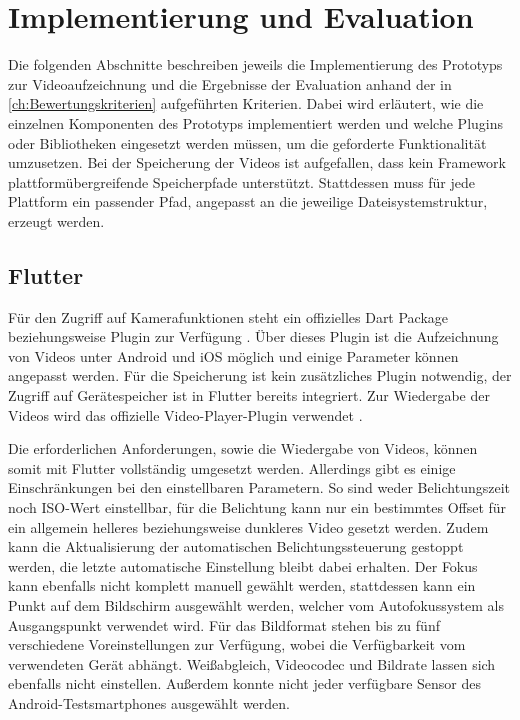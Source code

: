 \chapter{Implementierung und Evaluation}
\label{ch:Evaluation}

Die folgenden Abschnitte beschreiben jeweils die Implementierung des Prototyps zur Videoaufzeichnung und die Ergebnisse der Evaluation anhand der in \autoref{ch:Bewertungskriterien} aufgeführten Kriterien.
Dabei wird erläutert, wie die einzelnen Komponenten des Prototyps implementiert werden und welche Plugins oder Bibliotheken eingesetzt werden müssen, um die geforderte Funktionalität umzusetzen.
Bei der Speicherung der Videos ist aufgefallen, dass kein Framework plattformübergreifende Speicherpfade unterstützt.
Stattdessen muss für jede Plattform ein passender Pfad, angepasst an die jeweilige Dateisystemstruktur, erzeugt werden.


\section{Flutter}
\label{sec:Evaulation_Flutter}

Für den Zugriff auf Kamerafunktionen steht ein offizielles Dart Package beziehungsweise Plugin zur Verfügung \cite{Dart_Camera}.
Über dieses Plugin ist die Aufzeichnung von Videos unter Android und iOS möglich und einige Parameter können angepasst werden.
Für die Speicherung ist kein zusätzliches Plugin notwendig, der Zugriff auf Gerätespeicher ist in Flutter bereits integriert.
Zur Wiedergabe der Videos wird das offizielle Video-Player-Plugin verwendet \cite{Dart_Video}.

Die erforderlichen Anforderungen, sowie die Wiedergabe von Videos, können somit mit Flutter vollständig umgesetzt werden.
Allerdings gibt es einige Einschränkungen bei den einstellbaren Parametern.
So sind weder Belichtungszeit noch ISO-Wert einstellbar, für die Belichtung kann nur ein bestimmtes Offset für ein allgemein helleres beziehungsweise dunkleres Video gesetzt werden.
Zudem kann die Aktualisierung der automatischen Belichtungssteuerung gestoppt werden, die letzte automatische Einstellung bleibt dabei erhalten.
Der Fokus kann ebenfalls nicht komplett manuell gewählt werden, stattdessen kann ein Punkt auf dem Bildschirm ausgewählt werden, welcher vom Autofokussystem als Ausgangspunkt verwendet wird.
Für das Bildformat stehen bis zu fünf verschiedene Voreinstellungen zur Verfügung, wobei die Verfügbarkeit vom verwendeten Gerät abhängt.
Weißabgleich, Videocodec und Bildrate lassen sich ebenfalls nicht einstellen.
Außerdem konnte nicht jeder verfügbare Sensor des Android-Testsmartphones ausgewählt werden.



